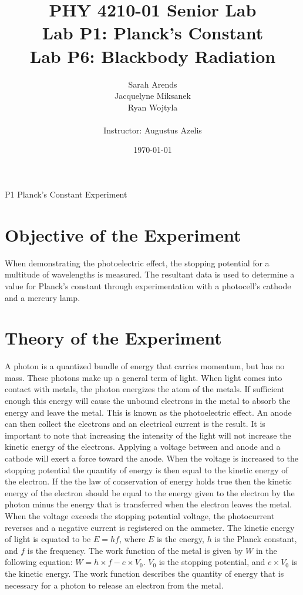 \documentclass[a4paper]{article}
\title{PHY 4210-01 Senior Lab \\Lab P1: Planck's Constant\\Lab P6: Blackbody Radiation}
\author{Sarah Arends \\
        Jacquelyne Miksanek \\
        Ryan Wojtyla \\ \\
        Instructor: Augustus Azelis}
\date{\today}
\begin{document}
\maketitle

\begin{abstract}
\qq 
\end{abstract}

\newpage

\tableofcontents

\newpage

P1 Planck's Constant Experiment

\newpage

\section{Objective of the Experiment}
\qq When demonstrating the photoelectric effect, the stopping
potential for a multitude of wavelengths is measured. The resultant
data is used to determine a value for Planck's constant through
experimentation with a photocell's cathode and a mercury lamp.

\section{Theory of the Experiment}
\qq A photon is a quantized bundle of energy that carries momentum,
but has no mass. These photons make up a general term of light. When
light comes into contact with metals, the photon energizes the atom of
the metals. If sufficient enough this energy will cause the unbound
electrons in the metal to absorb the energy and leave the metal. This
is known as the photoelectric effect. An anode can then collect the
electrons and an electrical current is the result. It is important to
note that increasing the intensity of the light will not increase the
kinetic energy of the electrons. Applying a voltage between and anode
and a cathode will exert a force toward the anode. When the voltage
is increased to the stopping potential the quantity of energy is then
equal to the kinetic energy of the electron. If the the law of
conservation of energy holds true then the kinetic energy of the
electron should be equal to the energy given to the electron by the
photon minus the energy that is transferred when the electron leaves
the metal. When the voltage exceeds the stopping potential voltage,
the photocurrent reverses and a negative current is registered on the
ammeter. The kinetic energy of light is equated to be $ E = hf$, where
$E$ is the energy, $h$ is the Planck constant, and $f$ is the
frequency. The work function of the metal is given by $W$ in the
following equation: $ W = h \times f - e \times V_0$. $V_0$ is the
stopping potential, and $e \times V_0$ is the kinetic energy. The work
function describes the quantity of energy that is necessary for a
photon to release an electron from the metal.
\end{document}
